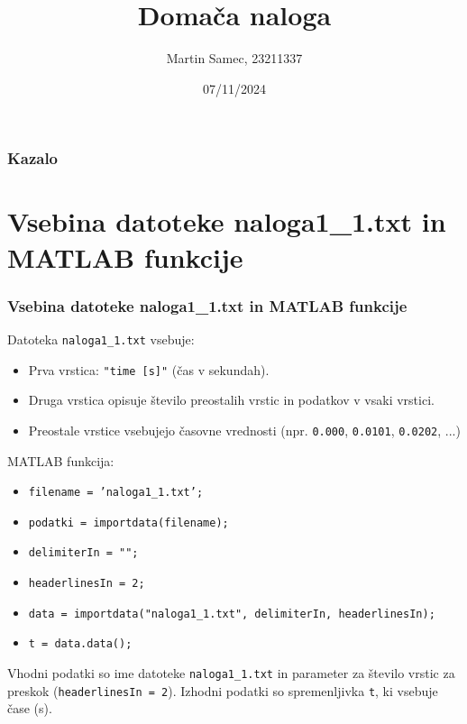 \documentclass{beamer}
\title{Domača naloga}
\author{Martin Samec, 23211337}
\institute{Fakulteta za strojništvo, Univerza v Ljubljani}
\date{07/11/2024}
\begin{document}
\frame{\titlepage}

\begin{frame}
\frametitle{Kazalo}
\tableofcontents
\end{frame}

\section{Vsebina datoteke naloga1\_1.txt in MATLAB funkcije}
\begin{frame}
\frametitle{Vsebina datoteke naloga1\_1.txt in MATLAB funkcije}
Datoteka \texttt{naloga1\_1.txt} vsebuje:
\begin{itemize}
    \item Prva vrstica: \texttt{"time [s]"} (čas v sekundah).
    \item Druga vrstica opisuje število preostalih vrstic in podatkov v vsaki vrstici.
    \item Preostale vrstice vsebujejo časovne vrednosti (npr. \texttt{0.000}, \texttt{0.0101}, \texttt{0.0202}, ...)
\end{itemize}

MATLAB funkcija:
\begin{itemize}
    \item \texttt{filename = 'naloga1\_1.txt';} 
    \item \texttt{podatki = importdata(filename);}
    \item \texttt{delimiterIn = "";}
    \item \texttt{headerlinesIn = 2;}
    \item \texttt{data = importdata("naloga1\_1.txt", delimiterIn, headerlinesIn);}
    \item \texttt{t = data.data();}
\end{itemize}

Vhodni podatki so ime datoteke \texttt{naloga1\_1.txt} in parameter za število vrstic za preskok (\texttt{headerlinesIn = 2}). Izhodni podatki so spremenljivka \texttt{t}, ki vsebuje čase (s).
\end{frame}
\end{document}
